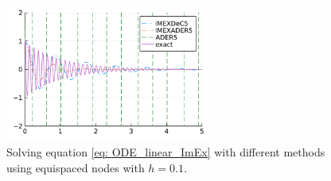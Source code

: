 \begin{figure}
	\centering
	\includegraphics[width=0.6\textwidth]{pdf/odepics/Num_val/exa_ImEx_linear.pdf}
	\caption{Solving equation \eqref{eq: ODE_linear_ImEx} with different methods using equispaced nodes with $h=0.1$.}
	\label{fig: exaImEx_linear}
\end{figure}

